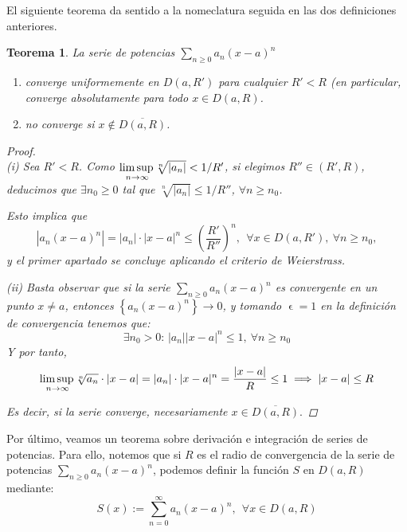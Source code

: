 \documentclass[11pt, a4paper]{article}
\let\epsilon\upvarepsilon
\theoremstyle{theorem-style}
\newtheorem{nth}{Teorema}[section]
\theoremstyle{definition-style}
\theoremstyle{remark-style}
\theoremstyle{example-style}
\newenvironment{nlist}
{\begin{enumerate}
\renewcommand\labelenumi{(\emph{\roman{enumi})}}}
{\end{enumerate}}
\begin{document}
El siguiente teorema da sentido a la nomeclatura seguida en las dos definiciones anteriores.

\begin{nth}
La serie de potencias $\displaystyle\sum_{n\geq 0} a_n (x-a)^n$  
\begin{nlist}
\item converge uniformemente en $D(a,R')$ para cualquier $R'<R$ (en particular, converge absolutamente para todo $x\in D(a,R)$.
\item no converge si $x\not\in \overline{D(a,R)}$.
\end{nlist}

\begin{proof} \hfill \\
	\textit{(i)} Sea $R'<R$. Como $\underset{n\to\infty}{\mbox{lim\,sup\,}} \sqrt[n]{|a_n|} < 1/R'$, si elegimos $R''\in (R',R)$, deducimos que $\exists n_0\geq 0$ tal que $\sqrt[n]{|a_n|} \leq 1/R''$, $\forall n\geq n_0$.

Esto implica que
\[
\left| a_n (x-a)^n\right| = |a_n|\cdot|x-a|^n \leq \left(\frac{R'}{R''}\right)^n, \ \ \forall x\in D(a,R'), \ \forall n\geq n_0,
\]
y el primer apartado se concluye aplicando el criterio de Weierstrass.

\textit{(ii)} Basta observar que si la serie $\sum_{n\geq 0} a_n (x-a)^n$ es convergente en un punto $x\not= a$, entonces $\left\{ a_n (x-a)^n \right\} \to 0$, y tomando $\epsilon = 1$ en la definición de convergencia tenemos que:
\[
\exists n_0>0: \,  |a_n| |x-a|^n \leq 1, \ \forall n\geq n_0
\]
Y por tanto, $$\underset{n\to\infty}{\mbox{lim\,sup\,}} \sqrt[n]{a_n} \cdot |x-a| = |a_n| \cdot |x-a|^n =\frac{|x-a|}{R} \leq 1 \implies |x-a| \le R$$

Es decir, si la serie converge, necesariamente $x \in \overline{D(a,R)}.$
\end{proof}
\end{nth}

Por último, veamos un teorema sobre derivación e integración de series de potencias. Para ello, notemos que si $R$ es el radio de convergencia de la serie de potencias $\displaystyle\sum_{n\geq 0} a_n (x-a)^n$, podemos definir la función $S$ en $D(a,R)$ mediante: \[ 
S(x):= \sum_{n= 0}^\infty a_n (x-a)^n
, \ \ \forall x\in  D(a,R)
\] 
\end{document}
